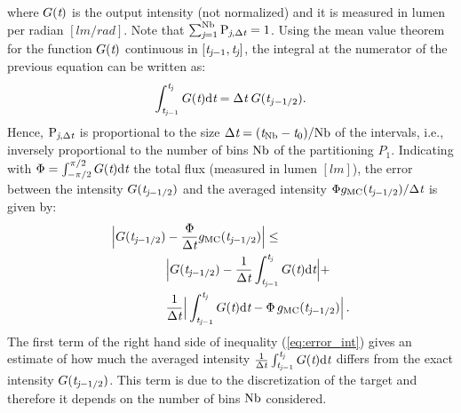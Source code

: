 where $G(\textit{t})$ is the output intensity (not normalized) and it is measured in lumen per radian $[lm/rad]$.
Note that $\sum_{\textit{j}=1}^{\textrm{Nb}}\textrm{P}_{\textit{j}, \Delta\textit{t}}=1$. Using the mean value theorem for the function $G(\textit{t})$ continuous in $[\textit{t}_{\textit{j}-1}, \textit{t}_{\textit{j}}]$, the integral at the numerator of the previous equation can be written as: \begin{equation}
\int_{\textit{t}_{\textit{j}-1}}^{\textit{t}_{\textit{j}}} G(\textit{t}) \textrm{d}\textit{t} = \Delta \textit{t}\;G(\textit{t}_{j-1/2}).
\end{equation}
Hence, $\textrm{P}_{\textit{j}, \Delta\textit{t}}$ is proportional to the size $\Delta\textit{t}= (\textit{t}_{\textrm{Nb}}-\textit{t}_{0})/{\textrm{Nb}}$ of the intervals, i.e., inversely proportional to the number of bins $\textrm{Nb}$ of the partitioning $P_1$.
Indicating with $\Phi = \int_{-\pi/2}^{\pi/2}G(\textit{t}) \textrm{d}\textit{t}$ the total flux (measured in lumen $[lm]$),
the error between the intensity $G(\textit{t}_{\textit{j}-1/2})$
 and the averaged  intensity $\Phi g_{\textrm{MC}}(\textit{t}_{\textit{j}-1/2})/\Delta\textit{t}$ is given by:
\begin{equation}\label{eq:error_int}
\begin{aligned}
\Big|G(\textit{t}_{\textit{j}-1/2})&-\frac{\Phi}
{\Delta\textit{t}}g_{\textrm{MC}}(\textit{t}_{\textit{j}-1/2})\Big| \leq\\
 &\Big|G(\textit{t}_{\textit{j}-1/2})-\frac{1}{\Delta \textit{t}}\int_{\textit{t}_{\textit{j}-1}}^{\textit{t}_{\textit{j}}} G(\textit{t})\textrm{d}\textit{t}\Big|+\\
&\frac{1}{\Delta \textit{t}}\Big|\int_{\textit{t}_{\textit{j}-1}}^{\textit{t}_{\textit{j}}} G(\textit{t})\textrm{d}\textit{t}-
\Phi\, g_{\textrm{MC}}(\textit{t}_{\textit{j}-1/2})\Big| \,.
\end{aligned}
\end{equation}
\indent The first term of the right hand side of inequality (\ref{eq:error_int}) gives an estimate of how much the averaged intensity $\frac{1}{\Delta \textit{t}}\int_{\textit{t}_{\textit{j}-1}}^{\textit{t}_{\textit{j}}} G(\textit{t})\textrm{d}\textit{t}$ differs from the exact intensity $G(\textit{t}_{\textit{j}-1/2})$.
This term is due to the discretization of the target and therefore it depends on the number of bins $\textrm{Nb}$ considered.
